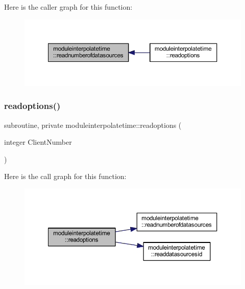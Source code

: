 Here is the caller graph for this function\+:\nopagebreak
\begin{figure}[H]
\begin{center}
\leavevmode
\includegraphics[width=350pt]{namespacemoduleinterpolatetime_ad3414b04b75a8f0e9e8aaf053859dc2e_icgraph}
\end{center}
\end{figure}
\mbox{\label{namespacemoduleinterpolatetime_a37ac04a065528663fbfe37b1238128fd}} 
\subsubsection{\texorpdfstring{readoptions()}{readoptions()}}
{\footnotesize\ttfamily subroutine, private moduleinterpolatetime\+::readoptions (\begin{DoxyParamCaption}\item[{integer}]{Client\+Number }\end{DoxyParamCaption})\hspace{0.3cm}{\ttfamily [private]}}

Here is the call graph for this function\+:\nopagebreak
\begin{figure}[H]
\begin{center}
\leavevmode
\includegraphics[width=350pt]{namespacemoduleinterpolatetime_a37ac04a065528663fbfe37b1238128fd_cgraph}
\end{center}
\end{figure}
\mbox{\label{namespacemoduleinterpolatetime_a8c2cfcaa51773241235e7d16f6cb9e46}} 
